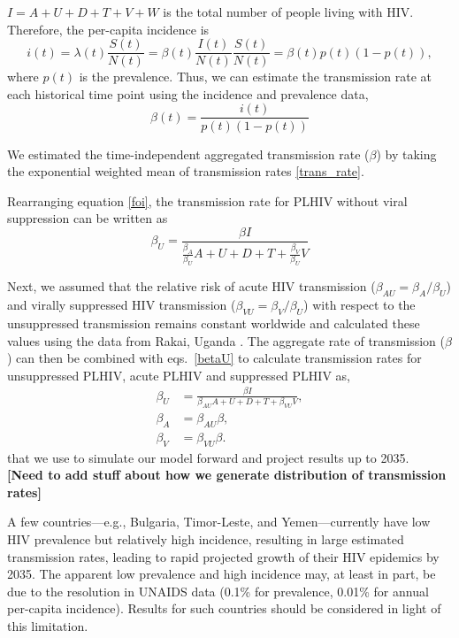 \documentclass{article}
\newcommand{\comment}[1]{\textbf{[#1]}}
\begin{document}
$I = A+U+D+T+V+W$ is the total number of people living with HIV. Therefore, the per-capita
incidence is
\begin{equation}
i(t) = \lambda(t) \frac{S(t)}{N(t)}
= \beta(t) \frac{I(t)}{N(t)} \frac{S(t)}{N(t)} =\beta(t) p(t) (1-p(t)),
\end{equation}
where $p(t)$ is the prevalence. Thus, we can estimate the
transmission rate at each historical time point using the incidence
and prevalence data,
\begin{equation}
  \label{trans_rate}
  \beta(t) = \frac{i(t)}{p(t)(1-p(t))}
\end{equation}


We estimated the time-independent aggregated transmission rate ($\beta$)
by taking the exponential weighted mean of transmission rates
\eqref{trans_rate}.


Rearranging equation \eqref{foi}, the transmission rate for PLHIV
without viral suppression can be written as
\begin{equation}
\label{betaU}
  \beta_{U} = \frac{\beta I}{\frac{\beta_{A}}{\beta_{U}}A +
    U+D+T+\frac{\beta_{V}}{\beta_{U}}V}
\end{equation}


Next, we assumed that the relative risk of acute HIV transmission
($\beta_{AU} = \beta_{A}/\beta_{U}$) and virally suppressed HIV
transmission ($\beta_{VU} = \beta_{V}/\beta_{U}$) with respect to the
unsuppressed transmission remains constant worldwide and calculated
these values using the data from Rakai, Uganda
\cite{Wawer2005-us}. The aggregate rate of transmission ($\beta$) can
then be combined with eqs.~\eqref{betaU} to calculate transmission
rates for unsuppressed PLHIV, acute PLHIV and suppressed PLHIV as,
\begin{align}
  \beta_{U} & = \frac{\beta I}{\beta_{AU}A +
              U+D+T+\beta_{VU}V}, \\
  \beta_{A} & = \beta_{AU}\beta, \\
  \beta_{V} & = \beta_{VU} \beta.
\end{align}
that we use to simulate our model forward and project results up to 2035.
\\

\comment{Need to add stuff about how we generate distribution of
  transmission rates}

A few countries—e.g., Bulgaria, Timor-Leste, and Yemen—currently have
low HIV prevalence but relatively high incidence, resulting in large
estimated transmission rates, leading to rapid projected growth of
their HIV epidemics by 2035. The apparent low prevalence and high
incidence may, at least in part, be due to the resolution in UNAIDS
data (0.1\% for prevalence, 0.01\% for annual per-capita incidence).
Results for such countries should be considered in light of this
limitation.
\end{document}
